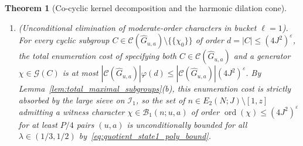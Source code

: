 \documentclass[11pt, a4paper]{article}
\theoremstyle{plain}
\newtheorem{theorem}{Theorem}[section]
\theoremstyle{definition}
\begin{document}
\begin{theorem}[Co-cyclic kernel decomposition and the harmonic dilation cone]
\begin{enumerate}[label=(\alph*)]
    \item \emph{(Unconditional elimination of moderate-order characters in bucket $\ell=1$).} 
    For every cyclic subgroup $C\in\mathcal{C}(\widehat{G}_{u,a})\setminus\{\{\chi_0\}\}$ of order $d=|C|\le(4J^{2})^{\varepsilon}$, the total enumeration cost of specifying both $C\in\mathcal{C}(\widehat{G}_{u,a})$ and a generator $\chi\in\mathcal{G}(C)$ is at most $|\mathcal{C}(\widehat{G}_{u,a})|\varphi(d)\le|\mathcal{C}(\widehat{G}_{u,a})|(4J^{2})^{\varepsilon}$. By Lemma~\ref{lem:total_maximal_subgroups}(b), this enumeration cost is strictly absorbed by the large sieve on $\mathcal{I}_1$, so the set of $n\in E_2(N;J)\setminus[1,z]$ admitting a witness character $\chi\in\mathcal{B}_1(n;u,a)$ of order $\operatorname{ord}(\chi)\le(4J^{2})^{\varepsilon}$ for at least $P/4$ pairs $(u,a)$ is unconditionally bounded for all $\lambda\in(1/3,1/2)$ by~\eqref{eq:quotient_state1_poly_bound}.
    

\end{enumerate}
\end{theorem}
\end{document}
